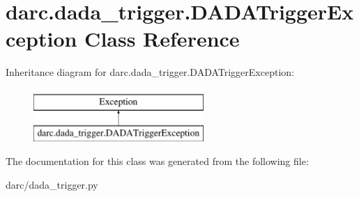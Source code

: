 \hypertarget{classdarc_1_1dada__trigger_1_1_d_a_d_a_trigger_exception}{}\section{darc.\+dada\+\_\+trigger.\+D\+A\+D\+A\+Trigger\+Exception Class Reference}
\label{classdarc_1_1dada__trigger_1_1_d_a_d_a_trigger_exception}
Inheritance diagram for darc.\+dada\+\_\+trigger.\+D\+A\+D\+A\+Trigger\+Exception\+:\begin{figure}[H]
\begin{center}
\leavevmode
\includegraphics[height=2.000000cm]{classdarc_1_1dada__trigger_1_1_d_a_d_a_trigger_exception}
\end{center}
\end{figure}


The documentation for this class was generated from the following file\+:\begin{DoxyCompactItemize}
\item 
darc/dada\+\_\+trigger.\+py\end{DoxyCompactItemize}

